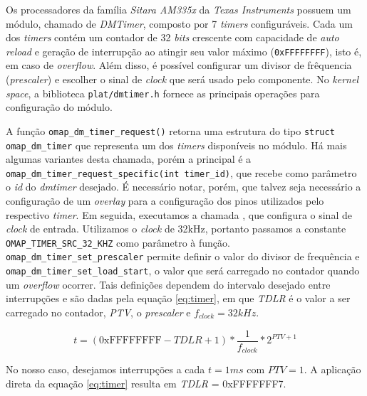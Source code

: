 \vspace{12pt}

Os processadores da família \textit{Sitara AM335x} da \textit{Texas Instruments}
possuem um módulo, chamado de \textit{DMTimer}, composto por 7 \textit{timers}
configuráveis. Cada um dos \textit{timers} contém um contador de 32
\textit{bits} crescente com capacidade de \textit{auto reload} e geração de
interrupção ao atingir seu valor máximo (\texttt{0xFFFFFFFF}), isto é, em caso
de \textit{overflow}. Além disso, é possível configurar um divisor de frêquencia
(\textit{prescaler}) e escolher o sinal de \textit{clock} que será usado pelo
componente. No \textit{kernel space}, a biblioteca \texttt{plat/dmtimer.h}
fornece as principais operações para configuração do módulo. 

\vspace{12pt}

A função \texttt{omap\_dm\_timer\_request()} retorna uma estrutura do tipo
\texttt{struct omap\_dm\_timer} que representa um dos \textit{timers}
disponíveis no módulo. Há mais algumas variantes desta chamada, porém a
principal é a \texttt{omap\_dm\_timer\_request\_specific(int timer\_id)}, que
recebe como parâmetro o \textit{id} do \textit{dmtimer} desejado. É necessário
notar, porém, que talvez seja necessário a configuração de um \textit{overlay}
para a configuração dos pinos utilizados pelo respectivo \textit{timer}. Em
seguida, executamos a chamada , que
configura o sinal de \textit{clock} de entrada. Utilizamos o \textit{clock} de
32kHz, portanto passamos a constante \texttt{OMAP\_TIMER\_SRC\_32\_KHZ} como
parâmetro à função. \texttt{omap\_dm\_timer\_set\_prescaler} permite definir o
valor do divisor de frequência e \texttt{omap\_dm\_timer\_set\_load\_start}, o
valor que será carregado no contador quando um \textit{overflow} ocorrer. Tais
definições dependem do intervalo desejado entre interrupções e são dadas pela
equação \ref{eq:timer}, em que \textit{TDLR} é o valor a ser carregado no
contador, \textit{PTV}, o \textit{prescaler} e \(f_{clock}=32kHz\).

\begin{equation} 
t = (\text{0xFFFFFFFF} - TDLR + 1)*\frac{1}{f_{clock}}*2^{PTV+1}
\label{eq:timer}
\end{equation}

No nosso caso, desejamos interrupções a cada \(t=1ms\) com \(PTV=1\). A
aplicação direta da equação \ref{eq:timer} resulta em \textit{TDLR} =
0xFFFFFFF7.

\vspace{12pt}

